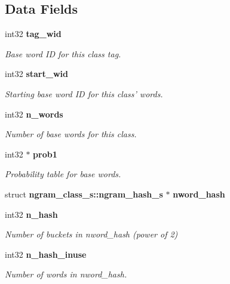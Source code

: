 \subsection*{\-Data \-Fields}
\begin{DoxyCompactItemize}
\item 
int32 {\bf tag\-\_\-wid}\label{structngram__class__s_ab5f3cc0142c9fd91b3c3d0e59906b556}

\begin{DoxyCompactList}\small\item\em \-Base word \-I\-D for this class tag. \end{DoxyCompactList}\item 
int32 {\bf start\-\_\-wid}\label{structngram__class__s_a370c88602c7c1f7e3ff1a767c027f5cb}

\begin{DoxyCompactList}\small\item\em \-Starting base word \-I\-D for this class' words. \end{DoxyCompactList}\item 
int32 {\bf n\-\_\-words}\label{structngram__class__s_af13562cbc44647435f315b18df5688dc}

\begin{DoxyCompactList}\small\item\em \-Number of base words for this class. \end{DoxyCompactList}\item 
int32 $\ast$ {\bf prob1}\label{structngram__class__s_a50077f48f135f1c666745a21574e4205}

\begin{DoxyCompactList}\small\item\em \-Probability table for base words. \end{DoxyCompactList}\item 
struct \*
{\bf ngram\-\_\-class\-\_\-s\-::ngram\-\_\-hash\-\_\-s} $\ast$ {\bfseries nword\-\_\-hash}\label{structngram__class__s_aab28f6b41e4020455ff2484a6fa850bb}

\item 
int32 {\bf n\-\_\-hash}\label{structngram__class__s_a7f450019eb6dc2e31b18eb3ab6009920}

\begin{DoxyCompactList}\small\item\em \-Number of buckets in nword\-\_\-hash (power of 2) \end{DoxyCompactList}\item 
int32 {\bf n\-\_\-hash\-\_\-inuse}\label{structngram__class__s_a79438cd582363800bc05da31a9ca49d6}

\begin{DoxyCompactList}\small\item\em \-Number of words in nword\-\_\-hash. \end{DoxyCompactList}\end{DoxyCompactItemize}


